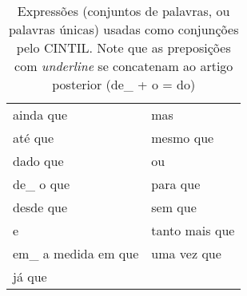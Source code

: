\begin{table}[!ht]
    \centering
    \begin{tabular}{|l|l|}
        \hline
        ainda que&mas\\
        até que&mesmo que\\
        dado que&ou\\
        de\_ o que&para que\\
        desde que&sem que\\
        e&tanto mais que\\
        em\_ a medida em que&uma vez que\\
        já que&\\
        \hline
    \end{tabular}
    \caption[Expressões usadas como conjunções pelo CINTIL]{Expressões (conjuntos de palavras, ou palavras únicas) usadas como conjunções pelo CINTIL. Note que as preposições com \textit{underline} se concatenam ao artigo posterior (de\_ + o = do)}
    \label{tab:tab_conj_concat_cintil}
\end{table}